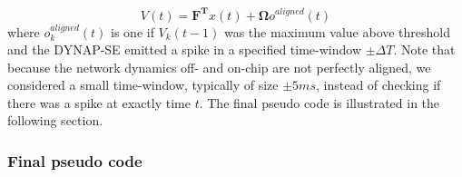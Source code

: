 \documentclass[twoside,11pt]{article}
\begin{document}
\begin{equation*}
   V(t) = \mathbf{F^T}x(t) + \mathbf{\Omega}o^{aligned}(t)
\end{equation*}
where $o^{aligned}_k(t)$ is one if $V_k(t-1)$ was the maximum value above threshold
and the DYNAP-SE emitted a spike in a specified time-window $\pm \Delta T$. Note that because
the network dynamics off- and on-chip are not perfectly aligned, we considered a small
time-window, typically of size $\pm 5ms$, instead of checking if there was a spike at exactly
time $t$.
The final pseudo code is illustrated in the following section.

\newpage

\subsubsection{Final pseudo code} \label{sec:pseudo-code}
\end{document}
